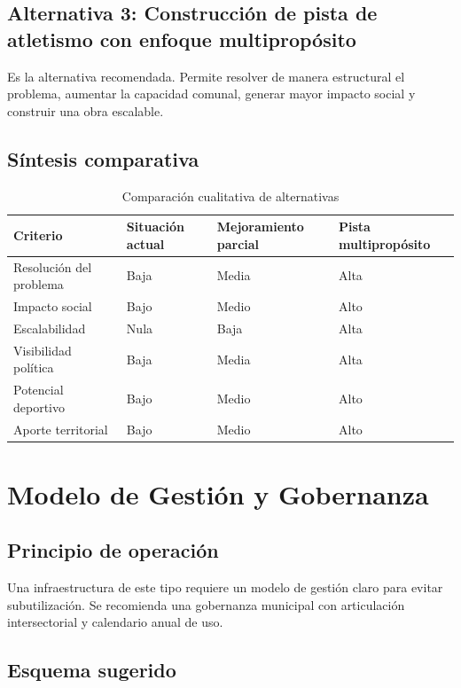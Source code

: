 \documentclass[12pt,letterpaper]{article}
\begin{document}
\subsection{Alternativa 3: Construcción de pista de atletismo con enfoque multipropósito}

Es la alternativa recomendada. Permite resolver de manera estructural el problema, aumentar la capacidad comunal, generar mayor impacto social y construir una obra escalable.

\subsection{Síntesis comparativa}

\begin{table}[H]
\centering
\caption{Comparación cualitativa de alternativas}
\begin{tabularx}{\textwidth}{>{\RaggedRight\arraybackslash}p{3.5cm}XXX}
\toprule
\textbf{Criterio} & \textbf{Situación actual} & \textbf{Mejoramiento parcial} & \textbf{Pista multipropósito} \\
\midrule
Resolución del problema & Baja & Media & Alta \\
Impacto social & Bajo & Medio & Alto \\
Escalabilidad & Nula & Baja & Alta \\
Visibilidad política & Baja & Media & Alta \\
Potencial deportivo & Bajo & Medio & Alto \\
Aporte territorial & Bajo & Medio & Alto \\
\bottomrule
\end{tabularx}
\end{table}

\section{Modelo de Gestión y Gobernanza}

\subsection{Principio de operación}

Una infraestructura de este tipo requiere un modelo de gestión claro para evitar subutilización. Se recomienda una gobernanza municipal con articulación intersectorial y calendario anual de uso.

\subsection{Esquema sugerido}
\end{document}
